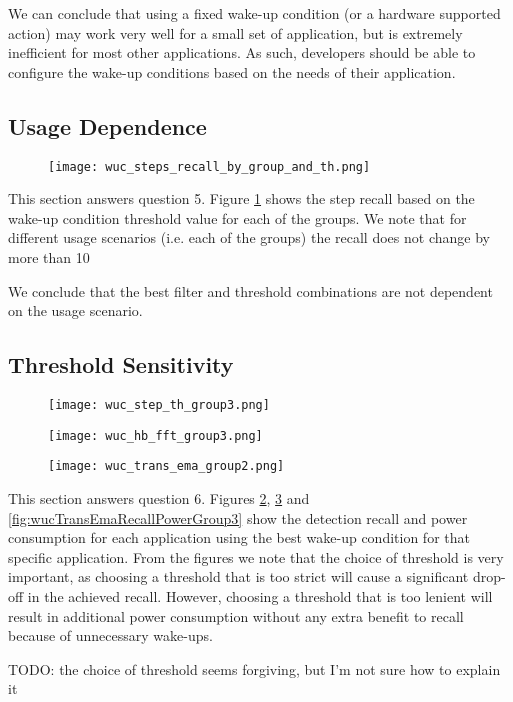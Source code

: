 We can conclude that using a fixed wake-up condition (or a hardware supported action) may work very well for a small set of application, but is extremely inefficient for most other applications. As such, developers should be able to configure the wake-up conditions based on the needs of their application. 

\subsection{Usage Dependence}

\begin{figure}[h]
	\texttt{[image: wuc\_steps\_recall\_by\_group\_and\_th.png]}
	\caption{}
    \label{fig:wucStepsRecallByGroupAndThreshold}
\end{figure}

This section answers question 5. Figure \ref{fig:wucStepsRecallByGroupAndThreshold} shows the step recall based on the wake-up condition threshold value for each of the groups. We note that for different usage scenarios (i.e. each of the groups) the recall does not change by more than 10%

We conclude that the best filter and threshold combinations are not dependent on the usage scenario.


\subsection{Threshold Sensitivity}

\begin{figure}[h]
	\texttt{[image: wuc\_step\_th\_group3.png]}
	\caption{}
    \label{fig:wucStepThRecallPowerGroup2}
\end{figure}

\begin{figure}[h]
	\texttt{[image: wuc\_hb\_fft\_group3.png]}
	\caption{}
    \label{fig:wucHbFftRecallPowerGroup3}
\end{figure}

\begin{figure}[h]
	\texttt{[image: wuc\_trans\_ema\_group2.png]}
	\caption{}
    \label{fig:wucTransEmaRecallPowerGroup2}
\end{figure}


This section answers question 6. Figures \ref{fig:wucStepThRecallPowerGroup2}, \ref{fig:wucHbFftRecallPowerGroup3} and \ref{fig:wucTransEmaRecallPowerGroup3} show the detection recall and power consumption for each application using the best wake-up condition for that specific application. From the figures we note that the choice of threshold is very important, as choosing a threshold that is too strict will cause a significant drop-off in the achieved recall. However, choosing a threshold that is too lenient will result in additional power consumption without any extra benefit to recall because of unnecessary wake-ups. 

TODO: the choice of threshold seems forgiving, but I'm not sure how to explain it